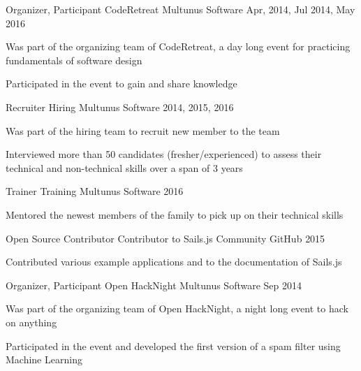 \begin{cventries}
  \cventry
    {Organizer, Participant}
    {CodeRetreat}
    {Multunus Software}
    {Apr, 2014, Jul 2014, May 2016}
    {
      \begin{cvitems}
        \item {Was part of the organizing team of CodeRetreat, a day long event for practicing fundamentals of software design}
        \item {Participated in the event to gain and share knowledge}
      \end{cvitems}
    }
  \cventry
    {Recruiter}
    {Hiring}
    {Multunus Software}
    {2014, 2015, 2016}
    {
      \begin{cvitems}
        \item {Was part of the hiring team to recruit new member to the team}
        \item {Interviewed more than 50 candidates (fresher/experienced) to assess their technical and non-technical skills over a span of 3 years}
      \end{cvitems}
    }
  \cventry
    {Trainer}
    {Training}
    {Multunus Software}
    {2016}
    {
      \begin{cvitems}
        \item {Mentored the newest members of the family to pick up on their technical skills}
      \end{cvitems}
    }
  \cventry
    {Open Source Contributor}
    {Contributor to Sails.js Community}
    {GitHub}
    {2015}
    {
      \begin{cvitems}
        \item {Contributed various example applications and to the documentation of Sails.js}
      \end{cvitems}
    }
  \cventry
    {Organizer, Participant}
    {Open HackNight}
    {Multunus Software}
    {Sep 2014}
    {
      \begin{cvitems}
        \item {Was part of the organizing team of Open HackNight, a night long event to hack on anything}
        \item {Participated in the event and developed the first version of a spam filter using Machine Learning}
      \end{cvitems}
    }
\end{cventries}
